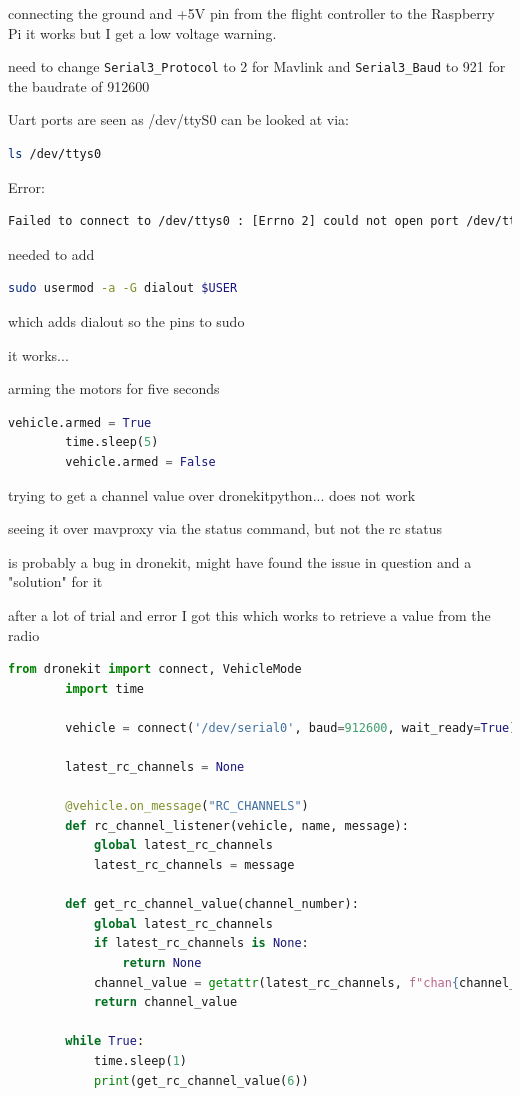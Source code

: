 \documentclass{article}
\begin{document}
	connecting the ground and +5V pin from the flight controller to the Raspberry Pi it works but I get a low voltage warning.
	
	need to change \lstinline|Serial3_Protocol| to 2 for Mavlink
	and \lstinline|Serial3_Baud| to 921 for the baudrate of 912600
	
	Uart ports are seen as /dev/ttyS0
	can be looked at via:
	\begin{lstlisting}[language=bash]
		ls /dev/ttys0
	\end{lstlisting}
	
	Error: 
	\begin{lstlisting}[language=bash]
		Failed to connect to /dev/ttys0 : [Errno 2] could not open port /dev/ttys0: [Errno 2] No such file or directory: '/dev/ttys0'
	\end{lstlisting}
	
	needed to add 
	\begin{lstlisting}[language=bash]
		sudo usermod -a -G dialout $USER
	\end{lstlisting}
	which adds dialout so the pins to sudo
	
	it works...
	
	arming the motors for five seconds
	\begin{lstlisting}[language=python]
		vehicle.armed = True
		time.sleep(5)
		vehicle.armed = False
	\end{lstlisting}
	
	
	trying to get a channel value over dronekitpython... does not work
	
	seeing it over mavproxy via the status command, but not the rc status
	
	is probably a bug in dronekit, might have found the issue in question and a  "solution" for it
	
	after a lot of trial and error I got this which works to retrieve a value from the radio
	\begin{lstlisting}[language=python]
		from dronekit import connect, VehicleMode
		import time
		
		vehicle = connect('/dev/serial0', baud=912600, wait_ready=True)
		
		latest_rc_channels = None
		
		@vehicle.on_message("RC_CHANNELS")
		def rc_channel_listener(vehicle, name, message):
			global latest_rc_channels
			latest_rc_channels = message
		
		def get_rc_channel_value(channel_number):
			global latest_rc_channels
			if latest_rc_channels is None:
				return None
			channel_value = getattr(latest_rc_channels, f"chan{channel_number}_raw", None)
			return channel_value
		
		while True: 
			time.sleep(1)
			print(get_rc_channel_value(6))
	\end{lstlisting}
	
\end{document}
